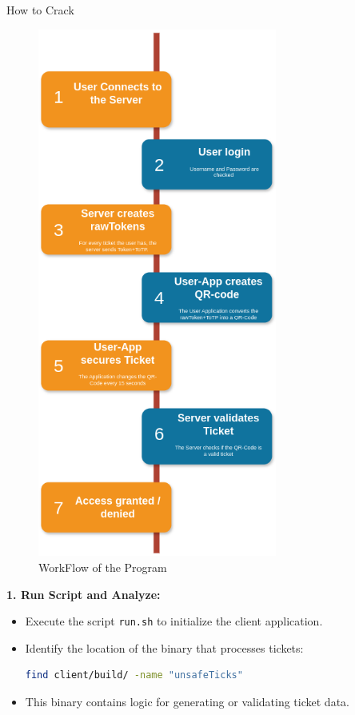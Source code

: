 \documentclass[final,dvipsnames]{beamer}
\newlength{\colwidth}
\begin{document}
\begin{frame}[t, fragile]
\begin{columns}[t]
\begin{column}{\colwidth}
    \begin{block}{How to Crack}
        \begin{figure}[h]
            \centering
            \includegraphics[width=0.7\textwidth]{figures/WorkFlow.drawio.png}
            \caption{WorkFlow of the Program}
            \label{fig:WorkFlow}
        \end{figure}
        \footnotesize        
        \textbf{1. Run Script and Analyze:}
        \begin{itemize}
            \item Execute the script \texttt{run.sh} to initialize the client application.
            \item Identify the location of the binary that processes tickets:
            \begin{lstlisting}[language=bash]
            find client/build/ -name "unsafeTicks"
            \end{lstlisting}
            \item This binary contains logic for generating or validating ticket data.
        \end{itemize}
        

\end{block}
\end{column}
\end{columns}
\end{frame}
\end{document}
